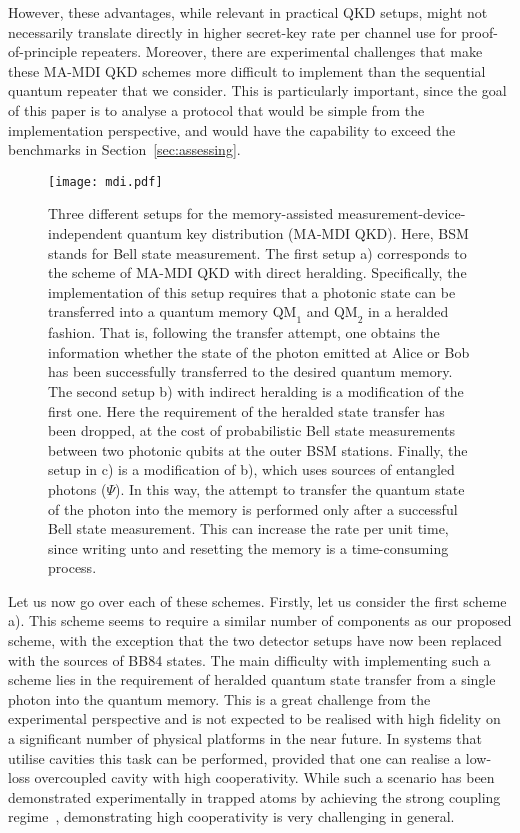 \documentclass[aps,pra,reprint,superscriptaddress]{revtex4-1}
\begin{document}
However, these advantages, while relevant in practical QKD setups, might not necessarily translate directly in higher secret-key rate per channel use for proof-of-principle repeaters. Moreover, there are experimental challenges that make these MA-MDI QKD schemes more difficult to implement than the sequential quantum repeater that we consider. This is particularly important, since the goal of this paper is to analyse a protocol that would be simple from the implementation perspective, and would have the capability to exceed the benchmarks in Section~\ref{sec:assessing}.
%
\begin{center}
\begin{figure}
\centering
\texttt{[image: mdi.pdf]}
\caption{Three different setups for the memory-assisted measurement-device-independent quantum key distribution (MA-MDI QKD). Here, BSM stands for Bell state measurement. The first setup a) corresponds to the scheme of MA-MDI QKD with direct heralding. Specifically, the implementation of this setup requires that a photonic state can be transferred into a quantum memory $\textrm{QM}_1$ and $\textrm{QM}_2$ in a heralded fashion. That is, following the transfer attempt, one obtains the information whether the state of the photon emitted at Alice or Bob has been successfully transferred to the desired quantum memory. The second setup b) with indirect heralding is a modification of the first one. Here the requirement of the heralded state transfer has been dropped, at the cost of probabilistic Bell state measurements between two photonic qubits at the outer BSM stations. Finally, the setup in c) is a modification of b), which uses sources of entangled photons ($\Psi$). In this way, the attempt to transfer the quantum state of the photon into the memory is performed only after a successful Bell state measurement.  This can increase the rate per unit time, since writing unto and resetting the memory is a time-consuming process. }
\label{fig:mdi}
\end{figure}
\end{center}

Let us now go over each of these schemes. Firstly, let us consider the first scheme a). This scheme seems to require a similar number of components as our proposed scheme, with the exception that the two detector setups have now been replaced with the sources of BB84 states. The main difficulty with implementing such a scheme lies in the requirement of heralded quantum state transfer from a single photon into the quantum memory. This is a great challenge from the experimental perspective and is not expected to be realised with high fidelity on a significant number of physical platforms in the near future. In systems that utilise cavities this task can be performed, provided that one can realise a low-loss overcoupled cavity with high cooperativity. While such a scenario has been demonstrated experimentally in trapped atoms by achieving the strong coupling regime~\cite{kalb2015heralded}, demonstrating high cooperativity is very challenging in general.
\end{document}
